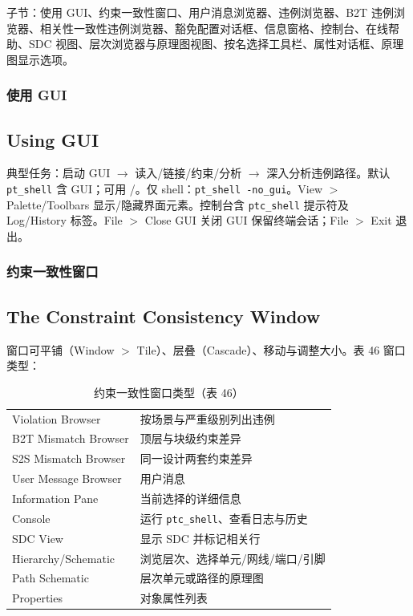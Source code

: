 子节：使用 GUI、约束一致性窗口、用户消息浏览器、违例浏览器、B2T 违例浏览器、相关性一致性违例浏览器、豁免配置对话框、信息窗格、控制台、在线帮助、SDC 视图、层次浏览器与原理图视图、按名选择工具栏、属性对话框、原理图显示选项。

\subsubsection{使用 GUI}
\subsection*{Using GUI}

典型任务：启动 GUI $\rightarrow$ 读入/链接/约束/分析 $\rightarrow$ 深入分析违例路径。默认 \texttt{pt\_shell} 含 GUI；可用 /。仅 shell：\texttt{pt\_shell -no\_gui}。View $>$ Palette/Toolbars 显示/隐藏界面元素。控制台含 \texttt{ptc\_shell} 提示符及 Log/History 标签。File $>$ Close GUI 关闭 GUI 保留终端会话；File $>$ Exit 退出。

\subsubsection{约束一致性窗口}
\subsection*{The Constraint Consistency Window}

窗口可平铺（Window $>$ Tile）、层叠（Cascade）、移动与调整大小。表 46 窗口类型：

\begin{table}[htbp]
\centering
\caption{约束一致性窗口类型（表 46）}
\small
\begin{tabular}{|L{3.2cm}|L{8.8cm}|}
\hline
{} &  \\
\hline
Violation Browser & 按场景与严重级别列出违例 \\
B2T Mismatch Browser & 顶层与块级约束差异 \\
S2S Mismatch Browser & 同一设计两套约束差异 \\
User Message Browser & 用户消息 \\
Information Pane & 当前选择的详细信息 \\
Console & 运行 \texttt{ptc\_shell}、查看日志与历史 \\
SDC View & 显示 SDC 并标记相关行 \\
Hierarchy/Schematic & 浏览层次、选择单元/网线/端口/引脚 \\
Path Schematic & 层次单元或路径的原理图 \\
Properties & 对象属性列表 \\
\hline
\end{tabular}
\end{table}


